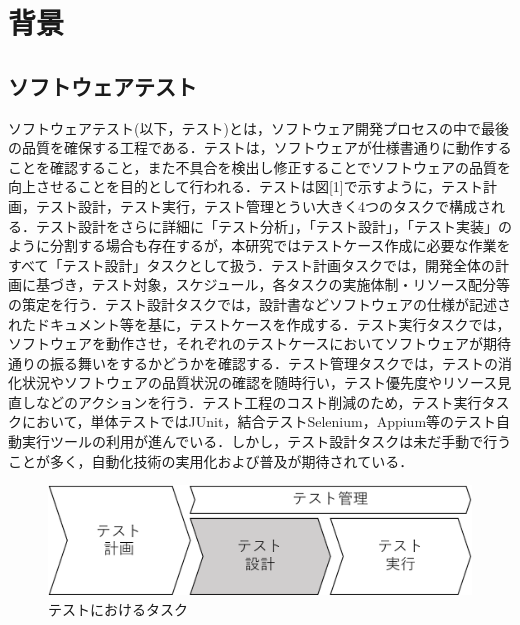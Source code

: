 \documentclass[12pt]{jarticle} %
\begin{document}

\newpage
\section{背景}
\subsection{ソフトウェアテスト}
ソフトウェアテスト(以下，テスト)とは，ソフトウェア開発プロセスの中で最後の品質を確保する工程である．テストは，ソフトウェアが仕様書通りに動作することを確認すること，また不具合を検出し修正することでソフトウェアの品質を向上させることを目的として行われる．テストは図[1]で示すように，テスト計画，テスト設計，テスト実行，テスト管理とうい大きく4つのタスクで構成される．テスト設計をさらに詳細に「テスト分析」，「テスト設計」，「テスト実装」のように分割する場合も存在するが，本研究ではテストケース作成に必要な作業をすべて「テスト設計」タスクとして扱う．テスト計画タスクでは，開発全体の計画に基づき，テスト対象，スケジュール，各タスクの実施体制・リソース配分等の策定を行う．テスト設計タスクでは，設計書などソフトウェアの仕様が記述されたドキュメント等を基に，テストケースを作成する．テスト実行タスクでは，ソフトウェアを動作させ，それぞれのテストケースにおいてソフトウェアが期待通りの振る舞いをするかどうかを確認する．テスト管理タスクでは，テストの消化状況やソフトウェアの品質状況の確認を随時行い，テスト優先度やリソース見直しなどのアクションを行う．テスト工程のコスト削減のため，テスト実行タスクにおいて，単体テストではJUnit，結合テストSelenium，Appium等のテスト自動実行ツールの利用が進んでいる．しかし，テスト設計タスクは未だ手動で行うことが多く，自動化技術の実用化および普及が期待されている．

\begin{figure}[htbp]
  \begin{center}
    \includegraphics[clip,width=12cm]{test-task.pdf}
    \caption{テストにおけるタスク}
    \label{fig:1}
  \end{center}
\end{figure}
\end{document}
